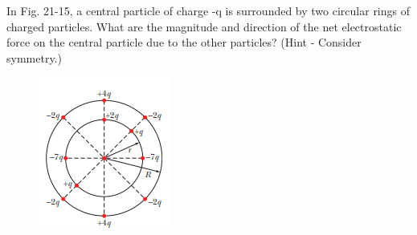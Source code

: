 \documentclass[11pt]{exam}
\begin{document}
\newpage 


\begin{questions}





\addpoints
\question[10] In Fig. 21-15, a central particle of charge -q is surrounded by two circular rings of charged particles. What are the magnitude and direction of the net electrostatic force on the central particle due to the other particles? (Hint - Consider symmetry.)\begin{figure}[H]
\centering
\includegraphics[scale=0.8]{assets/Halliday_ch21q5.png}
\end{figure}
\newpage


\end{questions}
\end{document}
